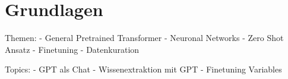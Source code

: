 \chapter{Grundlagen}\label{ch:preliminaries}

Themen:
- General Pretrained Transformer
- Neuronal Networks
- Zero Shot Ansatz
- Finetuning
- Datenkuration

Topics:
- GPT als Chat
- Wissenextraktion mit GPT
- Finetuning Variables

